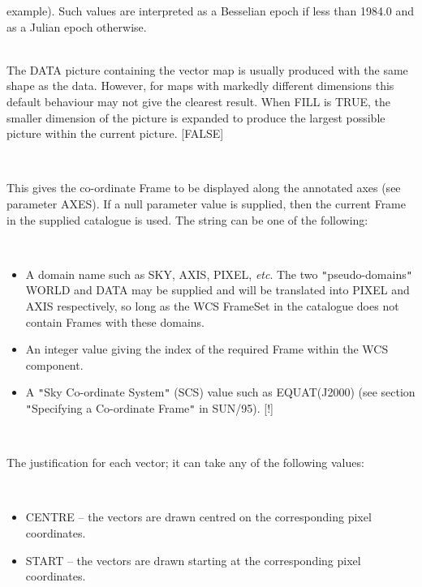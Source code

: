 \documentclass[twoside,11pt]{article}
\newcommand{\xref}[3]{#1}
\renewcommand{\_}{\texttt{\symbol{95}}}
\newcommand{\sstsubsection}[1]{ \item[{#1}] \mbox{} \\}
\newcommand{\sstitemlist}[1]{
  \mbox{} \\
  \vspace{-3.5ex}
  \begin{itemize}
     #1
  \end{itemize}
}
\newcommand{\sstitem}{\item}
\newcommand{\sstsubsection}[1]{\item[{#1}]}
\newcommand{\sstitemlist}[1]{
      \begin{itemize}
         #1
      \end{itemize}
      \\
   }
\newcommand{\sstitem}{\item}
\begin{document}
{{{         example). Such values are interpreted as a Besselian epoch if less
         than 1984.0 and as a Julian epoch otherwise.
      }
      \sstsubsection{
         FILL = \_LOGICAL (Read)
      }{
         The DATA picture containing the vector map is usually produced with
         the same shape as the data. However, for maps with markedly different
         dimensions this default behaviour may not give the clearest result.
         When FILL is TRUE, the smaller dimension of the picture is expanded
         to produce the largest possible picture within the current picture.
         [FALSE]
      }
      \sstsubsection{
         FRAME = LITERAL (Read)
      }{
         This gives the co-ordinate Frame to be displayed along the annotated
         axes (see parameter AXES). If a null parameter value is supplied,
         then the current Frame in the supplied catalogue is used. The
         string can be one of the following:
         \sstitemlist{

            \sstitem
            A domain name such as SKY, AXIS, PIXEL, \emph{etc}. The two
            {\tt "}pseudo-domains{\tt "} WORLD and DATA may be supplied and will be
            translated into PIXEL and AXIS respectively, so long as the WCS
            FrameSet in the catalogue does not contain Frames with these domains.

            \sstitem
            An integer value giving the index of the required Frame within
            the WCS component.

            \sstitem
            A {\tt "}Sky Co-ordinate System{\tt "} (SCS) value such as 
            EQUAT(J2000) (see section {\tt "}\xref{Specifying a
            Co-ordinate Frame}{sun95}{se_scs}{\tt "} in \xref{SUN/95}{sun95}{}). [!]
         }
      }
      \sstsubsection{
         JUST = LITERAL (Read)
      }{
         The justification for each vector; it can take any of the
         following values:
         \sstitemlist{

            \sstitem
               CENTRE -- the vectors are drawn centred on the
               corresponding pixel coordinates.

            \sstitem
               START -- the vectors are drawn starting at the
               corresponding pixel coordinates.

}}}}
\end{document}

